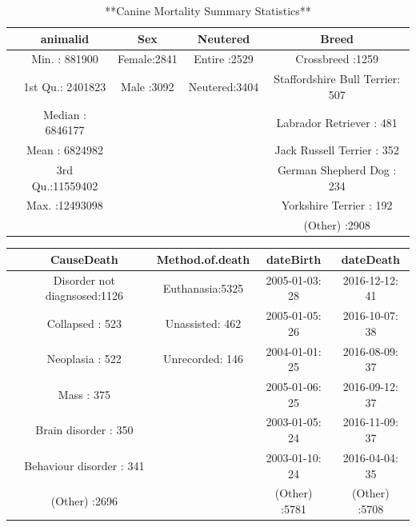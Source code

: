 \documentclass[
]{book}
\begin{document}
\begin{table}

\caption{\label{tab:unnamed-chunk-19}**Canine Mortality Summary Statistics**}
\centering
\begin{tabular}[t]{l|c|c|c|c}
\hline
  &    animalid &     Sex &     Neutered &                        Breed\\
\hline
 & Min.   :  881900 & Female:2841 & Entire  :2529 & Crossbreed                :1259\\
\hline
 & 1st Qu.: 2401823 & Male  :3092 & Neutered:3404 & Staffordshire Bull Terrier: 507\\
\hline
 & Median : 6846177 &  &  & Labrador Retriever        : 481\\
\hline
 & Mean   : 6824982 &  &  & Jack Russell Terrier      : 352\\
\hline
 & 3rd Qu.:11559402 &  &  & German Shepherd Dog       : 234\\
\hline
 & Max.   :12493098 &  &  & Yorkshire Terrier         : 192\\
\hline
 &  &  &  & (Other)                   :2908\\
\hline
\end{tabular}
\end{table}

\begin{table}
\centering
\begin{tabular}{l|c|c|c|c}
\hline
  &                   CauseDeath &   Method.of.death &      dateBirth &      dateDeath\\
\hline
 & Disorder not diagnsosed:1126 & Euthanasia:5325 & 2005-01-03:  28 & 2016-12-12:  41\\
\hline
 & Collapsed              : 523 & Unassisted: 462 & 2005-01-05:  26 & 2016-10-07:  38\\
\hline
 & Neoplasia              : 522 & Unrecorded: 146 & 2004-01-01:  25 & 2016-08-09:  37\\
\hline
 & Mass                   : 375 &  & 2005-01-06:  25 & 2016-09-12:  37\\
\hline
 & Brain disorder         : 350 &  & 2003-01-05:  24 & 2016-11-09:  37\\
\hline
 & Behaviour disorder     : 341 &  & 2003-01-10:  24 & 2016-04-04:  35\\
\hline
 & (Other)                :2696 &  & (Other)   :5781 & (Other)   :5708\\
\hline
\end{tabular}
\end{table}
\end{document}
